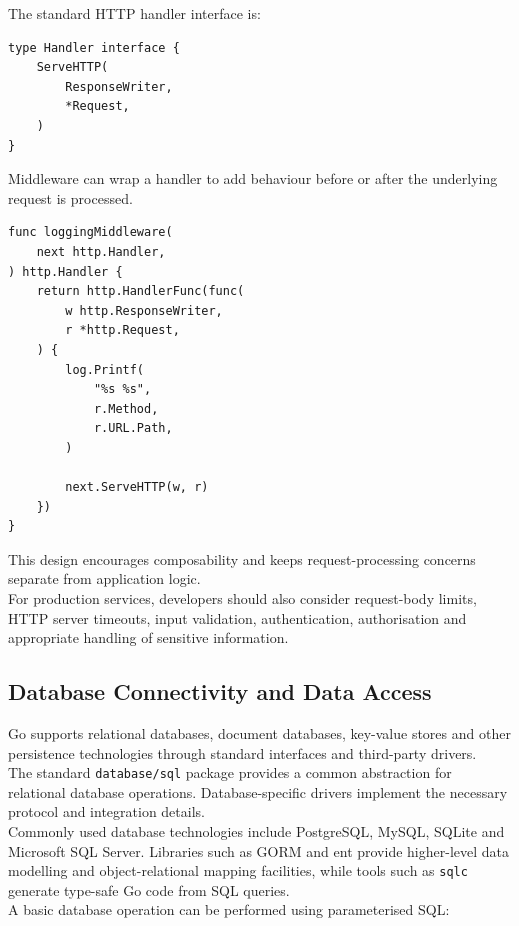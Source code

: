 The standard HTTP handler interface is:

\begin{lstlisting}
type Handler interface {
    ServeHTTP(
        ResponseWriter,
        *Request,
    )
}
\end{lstlisting}

Middleware can wrap a handler to add behaviour before or after the underlying request is processed.

\begin{lstlisting}
func loggingMiddleware(
    next http.Handler,
) http.Handler {
    return http.HandlerFunc(func(
        w http.ResponseWriter,
        r *http.Request,
    ) {
        log.Printf(
            "%s %s",
            r.Method,
            r.URL.Path,
        )

        next.ServeHTTP(w, r)
    })
}
\end{lstlisting}

This design encourages composability and keeps request-processing concerns separate from application logic.\\

For production services, developers should also consider request-body limits, HTTP server timeouts, input validation, authentication, authorisation and appropriate handling of sensitive information.

\subsection{Database Connectivity and Data Access}

Go supports relational databases, document databases, key-value stores and other persistence technologies through standard interfaces and third-party drivers.\\

The standard \texttt{database/sql} package provides a common abstraction for relational database operations. Database-specific drivers implement the necessary protocol and integration details.\\

Commonly used database technologies include PostgreSQL, MySQL, SQLite and Microsoft SQL Server. Libraries such as GORM and ent provide higher-level data modelling and object-relational mapping facilities, while tools such as \texttt{sqlc} generate type-safe Go code from SQL queries.\\

A basic database operation can be performed using parameterised SQL:

